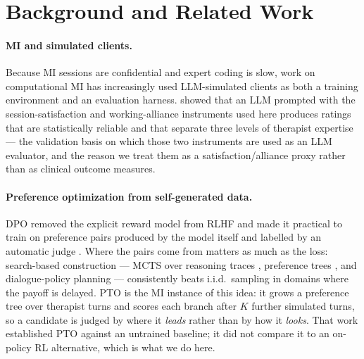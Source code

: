 \section{Background and Related Work}
\label{sec:related}

\paragraph{MI and simulated clients.}
Because MI sessions are confidential and expert coding is slow, work on computational MI
has increasingly used LLM-simulated clients as both a training environment and an
evaluation harness. \citet{yosef2024assessing} showed that an LLM prompted with the
session-satisfaction and working-alliance instruments used here produces ratings that are
statistically reliable and that separate three levels of therapist expertise --- the
validation basis on which those two instruments are used as an LLM evaluator, and the
reason we treat them as a satisfaction/alliance proxy rather than as clinical outcome
measures. 

\paragraph{Preference optimization from self-generated data.}
DPO \citep{rafailov2023dpo} removed the explicit reward model from RLHF
\citep{christiano2017deeprl, ouyang2022instructgpt} and made it practical to train on
preference pairs produced by the model itself and labelled by an automatic judge
\citep{yuan2024selfrewarding, guo2024oaif, pace2024westofn}. Where the pairs come from
matters as much as the loss: search-based construction --- MCTS over reasoning traces
\citep{xie2024mctsdpo}, preference trees \citep{yuan2024eurus}, and dialogue-policy
planning \citep{yu2023promptmcts, chen2025broaden} --- consistently beats i.i.d.\ sampling
in domains where the payoff is delayed. PTO \citep{baruch2025pto} is the MI instance of
this idea: it grows a preference tree over therapist turns and scores each branch after
$K$ further simulated turns, so a candidate is judged by where it \emph{leads} rather than
by how it \emph{looks}. That work established PTO against an untrained baseline; it did not
compare it to an on-policy RL alternative, which is what we do here.

